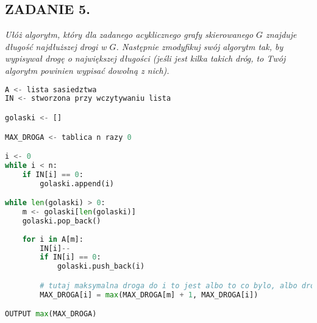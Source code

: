 \documentclass{article}
\begin{document}
\subsection*{ZADANIE 5.}
\emph{\color{pink}Ułóż algorytm, który dla zadanego acyklicznego grafy skierowanego $G$ znajduje długość najdłuższej drogi w $G$. Następnie zmodyfikuj swój algorytm tak, by wypisywał drogę o największej długości (jeśli jest kilka takich dróg, to Twój algorytm powinien wypisać dowolną z nich).}


\begin{lstlisting}[language=Python]
A <- lista sasiedztwa
IN <- stworzona przy wczytywaniu lista 

golaski <- []

MAX_DROGA <- tablica n razy 0

i <- 0
while i < n:
    if IN[i] == 0:
        golaski.append(i)

while len(golaski) > 0:
    m <- golaski[len(golaski)]
    golaski.pop_back()
    
    for i in A[m]:
        IN[i]--
        if IN[i] == 0:  
            golaski.push_back(i)

        # tutaj maksymalna droga do i to jest albo to co bylo, albo droga do m powiekszona o 1?
        MAX_DROGA[i] = max(MAX_DROGA[m] + 1, MAX_DROGA[i])

OUTPUT max(MAX_DROGA)

\end{lstlisting}
\end{document}
